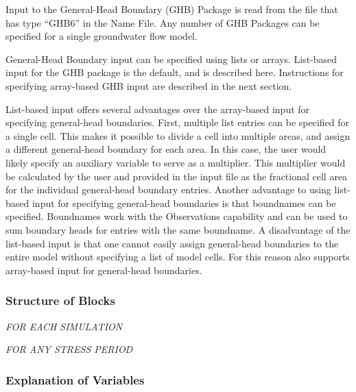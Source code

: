 Input to the General-Head Boundary (GHB) Package is read from the file that has type ``GHB6'' in the Name File.  Any number of GHB Packages can be specified for a single groundwater flow model.

General-Head Boundary input can be specified using lists or arrays.  List-based input for the GHB package is the default, and is described here.  Instructions for specifying array-based GHB input are described in the next section.

List-based input offers several advantages over the array-based input for specifying general-head boundaries.  First, multiple list entries can be specified for a single cell.  This makes it possible to divide a cell into multiple areas, and assign a different general-head boundary for each area.  In this case, the user would likely specify an auxiliary variable to serve as a multiplier.  This multiplier would be calculated by the user and provided in the input file as the fractional cell area for the individual general-head boundary entries.  Another advantage to using list-based input for specifying general-head boundaries is that boundnames can be specified.  Boundnames work with the Observations capability and can be used to sum boundary heads for entries with the same boundname.  A disadvantage of the list-based input is that one cannot easily assign general-head boundaries to the entire model without specifying a list of model cells.  For this reason \mf also supports array-based input for general-head boundaries.

\vspace{5mm}
\subsubsection{Structure of Blocks}
\vspace{5mm}

\noindent \textit{FOR EACH SIMULATION}


\vspace{5mm}
\noindent \textit{FOR ANY STRESS PERIOD}

\packageperioddescription

\vspace{5mm}
\subsubsection{Explanation of Variables}
\begin{description}

\end{description}

